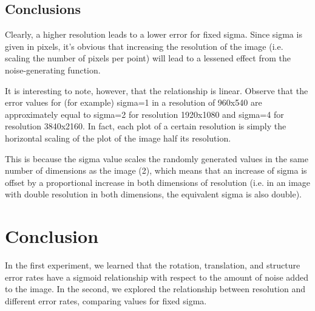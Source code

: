 \documentclass{article}
\begin{document}
\subsection{Conclusions}


Clearly, a higher resolution leads to a lower error for fixed sigma. Since sigma is given in pixels, it's obvious that increasing the resolution of the image (i.e. scaling the number of pixels per point) will lead to a lessened effect from the noise-generating function.



It is interesting to note, however, that the relationship is linear. Observe that the error values for (for example) sigma=1 in a resolution of 960x540 are approximately equal to sigma=2 for resolution 1920x1080 and sigma=4 for resolution 3840x2160. In fact, each plot of a certain resolution is simply the horizontal scaling of the plot of the image half its resolution. 


This is because the sigma value scales the randomly generated values in the same number of dimensions as the image (2), which means that an increase of sigma is offset by a proportional increase in both dimensions of resolution (i.e. in an image with double resolution in both dimensions, the equivalent sigma is also double).



\section{Conclusion}

In the first experiment, we learned that the rotation, translation, and structure error rates have a sigmoid relationship with respect to the amount of noise added to the image. In the second, we explored the relationship between resolution and different error rates, comparing values for fixed sigma.
\end{document}
